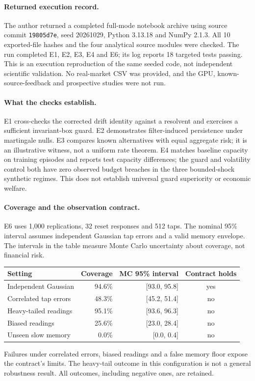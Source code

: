 \paragraph{Returned execution record.} The author returned a completed full-mode
notebook archive using source commit \texttt{19805d7e}, seed 20261029,
Python 3.13.18 and NumPy 2.1.3. All 10 exported-file hashes and the four analytical
source modules were checked. The run completed E1, E2, E3, E4 and E6; its log
reports 18 targeted tests passing. This is an execution reproduction of the same
seeded code, not independent scientific validation. No real-market CSV was
provided, and the GPU, known-source-feedback and prospective studies were not run.

\paragraph{What the checks establish.} E1 cross-checks the corrected drift identity
against a resolvent and exercises a sufficient invariant-box guard. E2 demonstrates
filter-induced persistence under martingale nulls. E3 compares known alternatives
with equal aggregate risk; it is an illustrative witness, not a uniform rate
theorem. E4 matches baseline capacity on training episodes and reports test
capacity differences; the guard and volatility control both have zero observed
budget breaches in the three bounded-shock synthetic regimes. This does not
establish universal guard superiority or economic welfare.

\paragraph{Coverage and the observation contract.} E6 uses 1,000 replications,
32 reset responses and 512 taps. The nominal 95\% interval assumes independent
Gaussian tap errors and a valid memory envelope. The intervals in the table
measure Monte Carlo uncertainty about coverage, not financial risk.
\begin{center}\small
\begin{tabular}{lrrc}
\toprule
Setting & Coverage & MC 95\% interval & Contract holds\\
\midrule
Independent Gaussian & 94.6\% & [93.0, 95.8] & yes\\
Correlated tap errors & 48.3\% & [45.2, 51.4] & no\\
Heavy-tailed readings & 95.1\% & [93.6, 96.3] & no\\
Biased readings & 25.6\% & [23.0, 28.4] & no\\
Unseen slow memory & 0.0\% & [0.0, 0.4] & no\\
\bottomrule
\end{tabular}
\end{center}
Failures under correlated errors, biased readings and a false memory floor expose
the contract's limits. The heavy-tail outcome in this configuration is not a
general robustness result. All outcomes, including negative ones, are retained.

